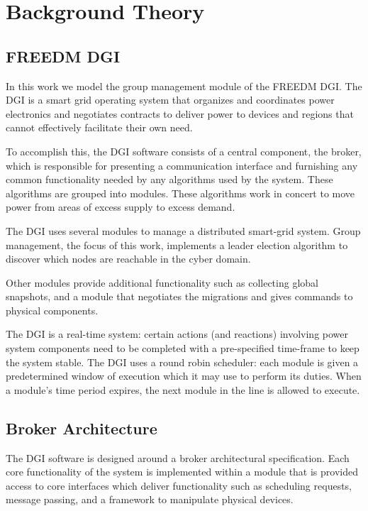 \chapter{Background Theory}

\section{FREEDM DGI}

In this work we model the group management module of the FREEDM DGI. The DGI is a smart grid operating system that organizes and coordinates power electronics and negotiates contracts to deliver power to devices and regions that cannot effectively facilitate their own need.

To accomplish this, the DGI software consists of a central component, the broker, which is responsible for presenting a communication interface and furnishing any common functionality needed by any algorithms used by the system. These algorithms are grouped into modules. These algorithms work in concert to move power from areas of excess supply to excess demand.

The DGI uses several modules to manage a distributed smart-grid system. Group management, the focus of this work, implements a leader election algorithm to discover which nodes are reachable in the cyber domain.

Other modules provide additional functionality such as collecting global snapshots, and a module that negotiates the migrations and gives commands to physical components.

The DGI is a real-time system: certain actions (and reactions) involving power system components need to be completed with a pre-specified time-frame to keep the system stable. The DGI uses a round robin scheduler: each module is given a predetermined window of execution which it may use to perform its duties. When a module's time period expires, the next module in the line is allowed to execute.

\section{Broker Architecture}

The DGI software is designed around a broker architectural specification. Each core functionality of the system is implemented within a module that is provided access to core interfaces which deliver functionality such as scheduling requests, message passing, and a framework to manipulate physical devices.


